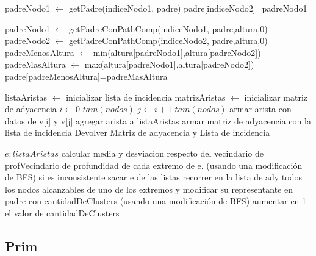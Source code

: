 \documentclass[8pt,a4paper]{article}
\begin{document}
\begin{codebox}
\li padreNodo1 $\gets$ getPadre(indiceNodo1, padre)
\li padre[indiceNodo2]=padreNodo1
\end{codebox}

\begin{codebox}
\li padreNodo1 $\gets$ getPadreConPathComp(indiceNodo1, padre,altura,0)
\li padreNodo2 $\gets$ getPadreConPathComp(indiceNodo2, padre,altura,0)
\li padreMenosAltura $\gets$ min(altura[padreNodo1],altura[padreNodo2])
\li padreMasAltura $\gets$ max(altura[padreNodo1],altura[padreNodo2])
\li padre[padreMenosAltura]=padreMasAltura
\end{codebox}


\begin{codebox}
\li listaAristas $\gets$ inicializar lista de incidencia
\li matrizAristas $\gets$ inicializar matriz de adyacencia
\li \For $i \gets 0$ \To $tam(nodos)$
\li 	\For  $j \gets i+1$ \To $tam(nodos)$
			\li armar arista con datos de v[i] y v[j]
			\li agregar arista a listaAristas
		\End
	\End
\li armar matriz de adyacencia con la lista de incidencia
\li Devolver Matriz de adyacencia y Lista de incidencia
\end{codebox}

\begin{codebox}
\li \For $e:listaAristas$
\li calcular media y desviacion respecto del vecindario de profVecindario de profundidad de cada extremo de e. (usando una modificación de BFS)
\li si es inconsistente
\li sacar e de las listas
\li recorrer en la lista de ady todos los nodos alcanzables de uno de los extremos y modificar su representante en padre con cantidadDeClusters (usando una modificación de BFS)
\li aumentar en 1 el valor de cantidadDeClusters

\li \End
\end{codebox}

\subsection{Prim}
\end{document}
